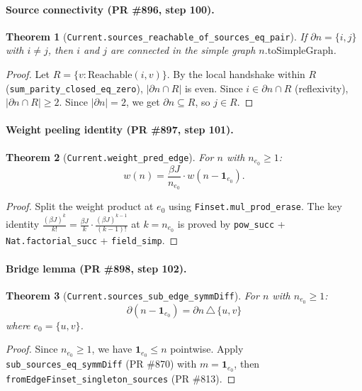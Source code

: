 \documentclass[a4paper,11pt]{article}
\newtheorem{theorem}{Theorem}
\begin{document}
\paragraph{Source connectivity (PR \#896, step 100).}

\begin{theorem}[\texttt{Current.sources\_reachable\_of\_sources\_eq\_pair}]
  If $\partial n = \{i, j\}$ with $i \ne j$, then $i$ and $j$ are connected
  in the simple graph $n.\mathrm{toSimpleGraph}$.
\end{theorem}
\begin{proof}
  Let $R = \{v : \mathrm{Reachable}(i, v)\}$.
  By the local handshake within $R$ (\texttt{sum\_parity\_closed\_eq\_zero}),
  $|\partial n \cap R|$ is even.
  Since $i \in \partial n \cap R$ (reflexivity), $|\partial n \cap R| \ge 2$.
  Since $|\partial n| = 2$, we get $\partial n \subseteq R$, so $j \in R$.
\end{proof}

\paragraph{Weight peeling identity (PR \#897, step 101).}

\begin{theorem}[\texttt{Current.weight\_pred\_edge}]
  For $n$ with $n_{e_0} \ge 1$:
  \[
    w(n) = \frac{\beta J}{n_{e_0}} \cdot w(n - \mathbf{1}_{e_0}).
  \]
\end{theorem}
\begin{proof}
  Split the weight product at $e_0$ using \texttt{Finset.mul\_prod\_erase}.
  The key identity $\frac{(\beta J)^k}{k!} = \frac{\beta J}{k} \cdot \frac{(\beta J)^{k-1}}{(k-1)!}$
  at $k = n_{e_0}$ is proved by \texttt{pow\_succ} + \texttt{Nat.factorial\_succ} + \texttt{field\_simp}.
\end{proof}

\paragraph{Bridge lemma (PR \#898, step 102).}

\begin{theorem}[\texttt{Current.sources\_sub\_edge\_symmDiff}]
  For $n$ with $n_{e_0} \ge 1$:
  \[
    \partial(n - \mathbf{1}_{e_0}) = \partial n \,\triangle\, \{u, v\}
  \]
  where $e_0 = \{u, v\}$.
\end{theorem}
\begin{proof}
  Since $n_{e_0} \ge 1$, we have $\mathbf{1}_{e_0} \le n$ pointwise.
  Apply \texttt{sub\_sources\_eq\_symmDiff} (PR \#870) with
  $m = \mathbf{1}_{e_0}$, then \texttt{fromEdgeFinset\_singleton\_sources} (PR \#813).
\end{proof}
\end{document}
